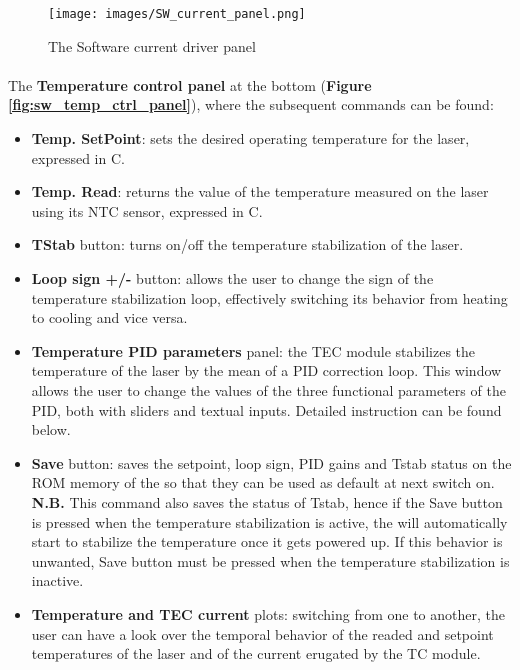     \begin{figure}[h]
        \centering
        \texttt{[image: images/SW\_current\_panel.png]}
        \caption{The \SoftwareType Software current driver panel}
        \label{fig:sw_curr_ctrl_panel}
    \end{figure}

\paragraph{} The \textbf{Temperature control panel} at the bottom (\textbf{Figure \ref{fig:sw_temp_ctrl_panel}}), where the subsequent commands can be found:
    \begin{itemize}
        \item \textbf{Temp. SetPoint}: sets the desired operating temperature for the laser, expressed in \textdegree{}C.
        
        \item \textbf{Temp. Read}: returns the value of the temperature measured on the laser using its NTC sensor, expressed in \textdegree{}C.
        
        \item \textbf{TStab} button: turns on/off the temperature stabilization of the laser.
        
        \item \textbf{Loop sign +/-} button: allows the user to change the sign of the temperature stabilization loop, effectively switching its behavior from heating to cooling and vice versa.
        
        \item \textbf{Temperature PID parameters} panel: the TEC module stabilizes the temperature of the laser by the mean of a PID correction loop. This window allows the user to change the values of the three functional parameters of the PID, both with sliders and textual inputs. Detailed instruction can be found below.
        
        \item \textbf{Save} button: saves the setpoint, loop sign, PID gains and Tstab status on the ROM memory of the \QubeModel  so that they can be used as default at next switch on.
        \newline \textbf{N.B.} This command also saves the status of Tstab, hence if the Save button is pressed when the temperature stabilization is active, the \QubeModel  will automatically start to stabilize the temperature once it gets powered up. If this behavior is unwanted, Save button must be pressed when the temperature stabilization is inactive.
        
        \item \textbf{Temperature and TEC current} plots: switching from one to another, the user can have a look over the temporal behavior of the readed and setpoint temperatures of the laser and of the current erugated by the TC module.
    \end{itemize}
